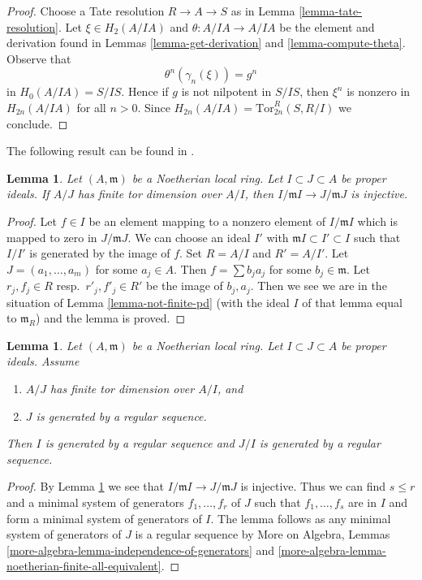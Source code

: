 \documentclass{stacks-project}
\theoremstyle{plain}
\newtheorem{lemma}[subsection]{Lemma}
\theoremstyle{definition}
\theoremstyle{remark}
\numberwithin{equation}{subsection}
\begin{document}
\begin{proof}
Choose a Tate resolution $R \to A \to S$ as in
Lemma \ref{lemma-tate-resolution}.
Let $\xi \in H_2(A/IA)$ and $\theta : A/IA \to A/IA$ be the element
and derivation found in Lemmas \ref{lemma-get-derivation} and
\ref{lemma-compute-theta}.
Observe that
$$
\theta^n(\gamma_n(\xi)) = g^n
$$
in $H_0(A/IA) = S/IS$.
Hence if $g$ is not nilpotent in $S/IS$, then $\xi^n$ is nonzero in
$H_{2n}(A/IA)$ for all $n > 0$. Since
$H_{2n}(A/IA) = \text{Tor}^R_{2n}(S, R/I)$ we conclude.
\end{proof}

\noindent
The following result can be found in \cite{Rodicio}.

\begin{lemma}
\label{lemma-injective}
Let $(A, \mathfrak m)$ be a Noetherian local ring. Let
$I \subset J \subset A$ be proper ideals. If $A/J$ has finite
tor dimension over $A/I$, then $I/\mathfrak m I \to J/\mathfrak m J$
is injective.
\end{lemma}

\begin{proof}
Let $f \in I$ be an element mapping to a nonzero element of $I/\mathfrak m I$
which is mapped to zero in $J/\mathfrak mJ$. We can choose an ideal $I'$
with $\mathfrak mI \subset I' \subset I$ such that $I/I'$ is generated by
the image of $f$. Set $R = A/I$ and $R' = A/I'$. Let $J = (a_1, \ldots, a_m)$
for some $a_j \in A$. Then $f = \sum b_j a_j$ for some $b_j \in \mathfrak m$.
Let $r_j, f_j \in R$ resp.\ $r'_j, f'_j \in R'$ be the image of $b_j, a_j$.
Then we see we are
in the situation of Lemma \ref{lemma-not-finite-pd}
(with the ideal $I$ of that lemma equal to $\mathfrak m_R$)
and the lemma is proved.
\end{proof}

\begin{lemma}
\label{lemma-regular-sequence}
Let $(A, \mathfrak m)$ be a Noetherian local ring. Let
$I \subset J \subset A$ be proper ideals. Assume
\begin{enumerate}
\item $A/J$ has finite tor dimension over $A/I$, and
\item $J$ is generated by a regular sequence.
\end{enumerate}
Then $I$ is generated by a regular sequence and $J/I$
is generated by a regular sequence.
\end{lemma}

\begin{proof}
By Lemma \ref{lemma-injective} we see that
$I/\mathfrak m I \to J/\mathfrak m J$
is injective. Thus we can find $s \leq r$ and a minimal system of
generators $f_1, \ldots, f_r$ of $J$ such that $f_1, \ldots, f_s$ are in $I$
and form a minimal system of generators of $I$.
The lemma follows as any minimal system of generators of $J$
is a regular sequence by
More on Algebra, Lemmas
\ref{more-algebra-lemma-independence-of-generators} and
\ref{more-algebra-lemma-noetherian-finite-all-equivalent}.
\end{proof}
\end{document}
